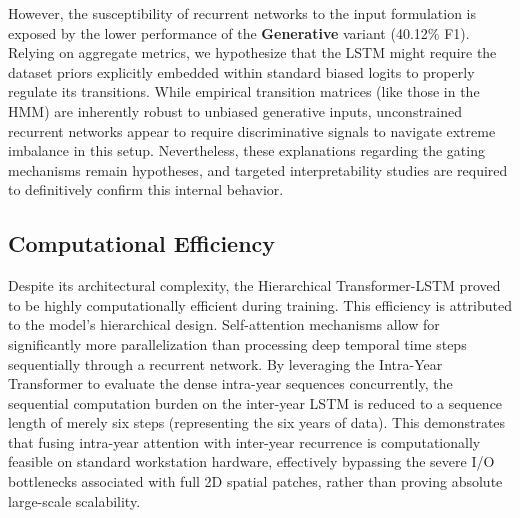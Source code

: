 However, the susceptibility of recurrent networks to the input formulation is exposed by the lower performance of the \textbf{Generative} variant (40.12\% F1).
Relying on aggregate metrics, we hypothesize that the LSTM might require the dataset priors
explicitly embedded within standard biased logits to properly regulate its transitions.
While empirical transition matrices (like those in the HMM) are inherently robust to unbiased generative inputs,
unconstrained recurrent networks appear to require discriminative signals to navigate extreme imbalance in this setup.
Nevertheless, these explanations regarding the gating mechanisms remain hypotheses,
and targeted interpretability studies are required to definitively confirm this internal behavior.

\subsection{Computational Efficiency}
\label{subsec:comp_efficiency}

Despite its architectural complexity, the Hierarchical Transformer-LSTM proved to be highly computationally efficient during training.
This efficiency is attributed to the model's hierarchical design.
Self-attention mechanisms allow for significantly more parallelization than processing deep temporal time steps sequentially through a recurrent network.
By leveraging the Intra-Year Transformer to evaluate the dense intra-year sequences concurrently,
the sequential computation burden on the inter-year LSTM is reduced to a sequence length of merely six steps (representing the six years of data).
This demonstrates that fusing intra-year attention with inter-year recurrence is computationally feasible on
standard workstation hardware, effectively bypassing the severe I/O bottlenecks associated with full 2D
spatial patches, rather than proving absolute large-scale scalability.